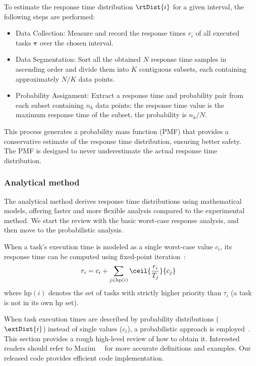     To estimate the response time distribution $\rtDist{i}$ for a given interval, the following steps are performed:
    \begin{itemize}
        \item Data Collection: Measure and record the response times $r_i$ of all executed tasks $\boldsymbol{\tau}$ over the chosen interval.
        \item Data Segmentation: Sort all the obtained $N$ response time samples in ascending order and divide them into $K$ contiguous subsets, each containing approximately $N/K$ data points.
        \item Probability Assignment: Extract a response time and probability pair from each subset containing $n_k$ data points: the response time value is the maximum response time of the subset, the probability is $n_k / N$.
    \end{itemize}
    This process generates a probability mass function (PMF) that provides a conservative estimate of the response time distribution, ensuring better safety.
    The PMF is designed to never underestimate the actual response time distribution.


	\subsubsection{Analytical method}
    The analytical method derives response time distributions using mathematical models, offering faster and more flexible analysis compared to the experimental method.
    We start the review with the basic worst-case response analysis, and then move to the probabilistic analysis.


	When a task’s execution time is modeled as a single worst-case value $c_i$, its response time can be computed using fixed-point iteration~\cite{Joseph1986FindingRT}:
	\begin{equation}
		r_i = c_i +\sum_{j \in \text{hp}(i)} \ceil{\frac{r_i}{T_j}}{c_j}
        \label{eq: rta_scalar}
	\end{equation}
    where $\text{hp}(i)$ denotes the set of tasks with strictly higher priority than $\tau_i$ (a task is not in its own $\text{hp}$ set).

    When task execution times are described by probability distributions ($\extDist{i}$) instead of single values ($c_i$), a probabilistic approach is employed~\cite{Maxim2013ResponseTA, Maxim2022ProbabilisticA}.
    This section provides a rough high-level review of how to obtain it.
    Interested readers should refer to Maxim~\etal~\cite{Maxim2022ProbabilisticA} for more accurate definitions and examples.
    Our released code provides efficient code implementation.

